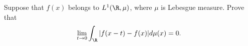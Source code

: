 Suppose that $f(x)$ belongs to $L^1(\R,\mu)$, where $\mu$ is Lebesgue
measure. Prove that $$\lim_{t\rightarrow
0}\int_{\R}|f(x-t)-f(x)|d\mu(x)=0.$$
